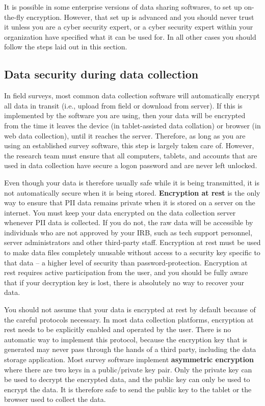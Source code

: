 It is possible in some enterprise versions of data sharing softwares, to set up on-the-fly encryption. 
However, that set up is advanced and you should never trust it unless you are a cyber security expert, 
or a cyber security expert within your organization have specified what it can be used for. In all
other cases you should follow the steps laid out in this section.

\subsection{Data security during data collection}

In field surveys, most common data collection software will automatically encrypt
all data in transit (i.e., upload from field or download from server).
If this is implemented by the software you are using, then your
data will be encrypted from the time it leaves the device (in tablet-assisted data 
collation) or browser (in web data collection), until it reaches the server. 
Therefore, as long as you are using an established survey software, this step is 
largely taken care of. However, the research team must ensure that all computers, 
tablets, and accounts that are used in data collection have secure a logon 
password and are never left unlocked.

Even though your data is therefore usually safe while it is being transmitted,
it is not automatically secure when it is being stored.
\textbf{Encryption at rest}
is the only way to ensure that PII data remains private when it is stored on a
server on the internet. You must keep your data encrypted on the data collection server 
whenever PII data is collected. If you do not, the raw data will be accessible by 
individuals who are not approved by your IRB, such as tech support personnel, server 
administrators and other third-party staff. Encryption at rest must be used to make
data files completely unusable without access to a security key specific to that 
data -- a higher level of security than password-protection. Encryption at rest 
requires active participation from the user, and you should be fully aware that 
if your decryption key is lost, there is absolutely no way to recover your data.

You should not assume that your data is encrypted at rest by default because of 
the careful protocols necessary. In most data collection platforms, encryption at 
rest needs to be explicitly enabled and operated by the user. There is no automatic 
way to implement this protocol, because the encryption key that is generated may 
never pass through the hands of a third party, including the data storage application.
Most survey software implement \textbf{asymmetric encryption} where 
there are two keys in a public/private key pair. Only the private key can be used to
decrypt the encrypted data, and the public key can only be used to encrypt the data.
It is therefore safe to send the public key to the tablet or the browser used to
collect the data. 

